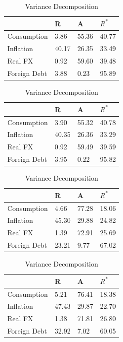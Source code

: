 \documentclass[12pt, a4paper]{article}
\begin{document}
\begin{table}[H]
\caption {\label{tab:table2} Variance Decomposition} 

\centering
{}
\begin{tabular}{llll}
 \hline
 &\textbf{R} & \textbf{A}  &  \textbf{$R^*$}  \\ 
 \hline
Consumption 	 & 	     3.86      &       55.36       &      40.77 \\
Inflation & 	  40.17      &       26.35       &      33.49  \\
Real FX & 	   0.92        &     59.60       &      39.48   \\
Foreign Debt	 & 	 3.88      &        0.23      &       95.89 \\
\hline
\end{tabular}
\centering
{}
\begin{tabular}{llll}
 \hline
 &\textbf{R} & \textbf{A}  &  \textbf{$R^*$}  \\ 
 \hline
Consumption 	 & 	       3.90   &          55.32       &      40.78    \\
Inflation & 	  40.35    &         26.36      &       33.29      \\
Real FX & 	    0.92       &      59.49        &     39.59   \\
Foreign Debt	 & 	   3.95       &       0.22       &      95.82   \\
\hline
\end{tabular}
\centering
{}
\begin{tabular}{llll}
 \hline
 &\textbf{R} & \textbf{A}  &  \textbf{$R^*$}  \\ 
 \hline
Consumption 	 & 	        4.66       &      77.28       &      18.06    \\
Inflation & 	    45.30      &       29.88       &      24.82     \\
Real FX & 	   1.39     &       72.91    &         25.69    \\
Foreign Debt	 & 	    23.21     &         9.77       &      67.02     \\
\hline
\end{tabular}

\centering
{}
\begin{tabular}{llll}
 \hline
 &\textbf{R} & \textbf{A}  &  \textbf{$R^*$}  \\ 
 \hline
Consumption 	 & 	          5.21     &        76.41      &       18.38     \\
Inflation  & 	   47.43      &       29.87        &     22.70      \\
Real FX  & 	      1.38        &     71.81        &     26.80     \\
Foreign Debt	 & 	   32.92    &          7.02        &     60.05   \\
\hline
\end{tabular}


\end{table}
\end{document}
